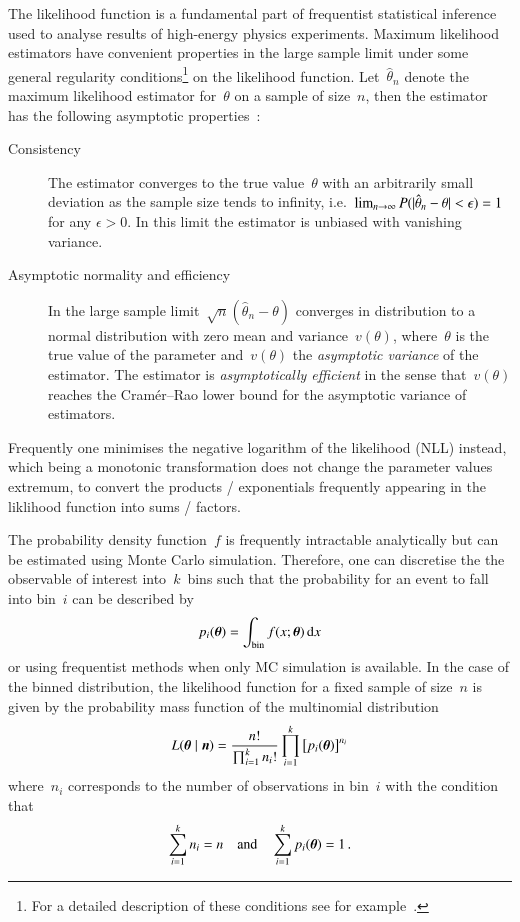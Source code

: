 The likelihood function is a fundamental part of frequentist
statistical inference used to analyse results of high-energy physics
experiments. Maximum likelihood estimators have convenient properties
in the large sample limit under some general regularity
conditions\footnote{For a detailed description of these conditions see
  for example~\cite{casella2001}.} on the likelihood
function. Let~$\hat{\theta}_n$ denote the maximum likelihood estimator
for~$\theta$ on a sample of size~$n$, then the estimator has the
following asymptotic properties~\cite{casella2001}:
\begin{description}
\item[Consistency] The estimator converges to the true value~$\theta$
  with an arbitrarily small deviation as the sample size tends to
  infinity, i.e.\
  $\lim_{n \rightarrow \infty} P(|\hat{\theta}_n - \theta| < \epsilon) = 1$
  for any $\epsilon > 0$. In this limit the estimator is unbiased with
  vanishing variance.

\item[Asymptotic normality and efficiency] In the large sample
  limit~$\sqrt{n}(\hat{\theta}_n - \theta)$ converges in distribution
  to a normal distribution with zero mean and variance~$v(\theta)$,
  where~$\theta$ is the true value of the parameter and~$v(\theta)$
  the \textit{asymptotic variance} of the estimator. The estimator is
  \textit{asymptotically efficient} in the sense that~$v(\theta)$
  reaches the Cram\'er--Rao lower bound for the asymptotic variance of
  estimators.
\end{description}

Frequently one minimises the negative logarithm of the likelihood
(NLL) instead, which being a monotonic transformation does not change
the parameter values extremum, to convert the products / exponentials
frequently appearing in the liklihood function into sums / factors.

The probability density function~$f$ is frequently intractable
analytically but can be estimated using Monte Carlo
simulation. Therefore, one can discretise the the observable of
interest into~$k$~bins such that the probability for an event to fall
into bin~$i$ can be described by
\begin{align*}
  p_i(\boldtheta) = \int_\text{bin} f(x; \boldtheta) \, \mathrm{d}x
\end{align*}
or using frequentist methods when only MC simulation is available. In
the case of the binned distribution, the likelihood function for a
fixed sample of size~$n$ is given by the probability mass function of
the multinomial distribution
\begin{align*}
  L(\boldtheta \mid \boldn) = \frac{n!}{\prod_{i=1}^k n_i!} \prod_{i = 1}^k \left[ p_i(\boldtheta) \right]^{n_i}
\end{align*}
where~$n_i$ corresponds to the number of observations in bin~$i$ with
the condition that
\begin{align*}
  \sum_{i = 1}^k n_i = n \quad \text{and} \quad \sum_{i = 1}^k p_i(\boldtheta) = 1 \,\text{.}
\end{align*}

